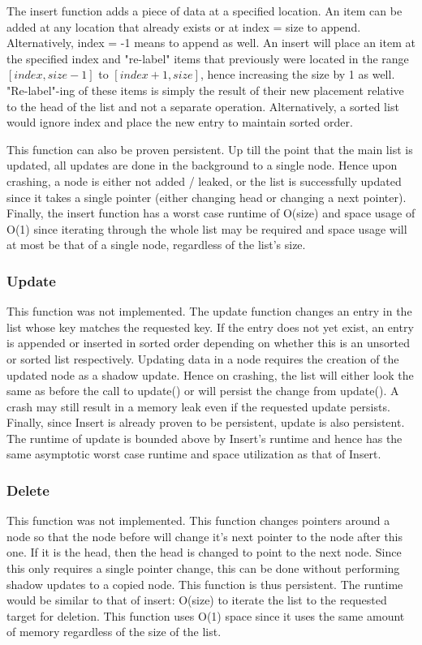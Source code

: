 \documentclass[twocolumn]{article}
\begin{document}
The insert function adds a piece of data at a specified location. An item can be
added at any location that already exists or at index = size to append.
Alternatively, index = -1 means to append as well. An insert will place an item
at the specified index and "re-label" items that previously were located in the
range $[index,size-1]$ to $[index+1,size]$, hence increasing the size by 1 as
well. "Re-label"-ing of these items is simply the result of their new placement
relative to the head of the list and not a separate operation. Alternatively,
a sorted list would ignore index and place the new entry to maintain sorted
order.

This function can also be proven persistent. Up till the point that the main
list is updated, all updates are done in the background to a single node. Hence
upon crashing, a node is either not added / leaked, or the list is successfully
updated since it takes a single pointer (either changing head or changing a next
pointer). Finally, the insert function has a worst case runtime of O(size) and
space usage of O(1) since iterating through the whole list may be required and
space usage will at most be that of a single node, regardless of the list's
size.

\subsubsection{Update}

This function was not implemented. The update function changes an entry in the
list whose key matches the requested key. If the entry does not yet exist, an
entry is appended or inserted in sorted order depending on whether this is an
unsorted or sorted list respectively. Updating data in a node requires the
creation of the updated node as a shadow update. Hence on crashing, the list
will either look the same as before the call to update() or will persist the
change from update(). A crash may still result in a memory leak even if the
requested update persists. Finally, since Insert is already proven to be
persistent, update is also persistent. The runtime of update is bounded above by
Insert's runtime and hence has the same asymptotic worst case runtime and space
utilization as that of Insert.

\subsubsection{Delete}

This function was not implemented. This function changes pointers around a node
so that the node before will change it's next pointer to the node after this
one. If it is the head, then the head is changed to point to the next node.
Since this only requires a single pointer change, this can be done without
performing shadow updates to a copied node. This function is thus persistent.
The runtime would be similar to that of insert: O(size) to iterate the list to
the requested target for deletion. This function uses O(1) space since it uses
the same amount of memory regardless of the size of the list.
\end{document}
